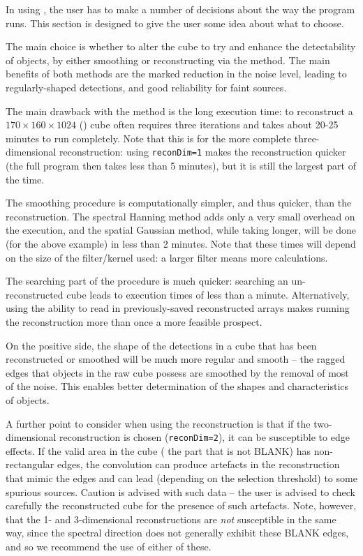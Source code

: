 \label{sec-notes}

In using \duchamp, the user has to make a number of decisions about
the way the program runs. This section is designed to give the user
some idea about what to choose.

The main choice is whether to alter the cube to try and enhance the
detectability of objects, by either smoothing or reconstructing via
the \atrous method. The main benefits of both methods are the marked
reduction in the noise level, leading to regularly-shaped detections,
and good reliability for faint sources.

The main drawback with the \atrous method is the long execution time:
to reconstruct a $170\times160\times1024$ (\hipass) cube often
requires three iterations and takes about 20-25 minutes to run
completely. Note that this is for the more complete three-dimensional
reconstruction: using \texttt{reconDim=1} makes the reconstruction
quicker (the full program then takes less than 5 minutes), but it is
still the largest part of the time.

The smoothing procedure is computationally simpler, and thus quicker,
than the reconstruction. The spectral Hanning method adds only a very
small overhead on the execution, and the spatial Gaussian method,
while taking longer, will be done (for the above example) in less than
2 minutes. Note that these times will depend on the size of the
filter/kernel used: a larger filter means more calculations.

The searching part of the procedure is much quicker: searching an
un-reconstructed cube leads to execution times of less than a
minute. Alternatively, using the ability to read in previously-saved
reconstructed arrays makes running the reconstruction more than once a
more feasible prospect.

On the positive side, the shape of the detections in a cube that has
been reconstructed or smoothed will be much more regular and smooth --
the ragged edges that objects in the raw cube possess are smoothed by
the removal of most of the noise. This enables better determination of
the shapes and characteristics of objects.

A further point to consider when using the reconstruction is that if
the two-dimensional reconstruction is chosen (\texttt{reconDim=2}), it
can be susceptible to edge effects. If the valid area in the cube (\ie
the part that is not BLANK) has non-rectangular edges, the convolution
can produce artefacts in the reconstruction that mimic the edges and
can lead (depending on the selection threshold) to some spurious
sources. Caution is advised with such data -- the user is advised to
check carefully the reconstructed cube for the presence of such
artefacts. Note, however, that the 1- and 3-dimensional
reconstructions are \emph{not} susceptible in the same way, since the
spectral direction does not generally exhibit these BLANK edges, and
so we recommend the use of either of these.


